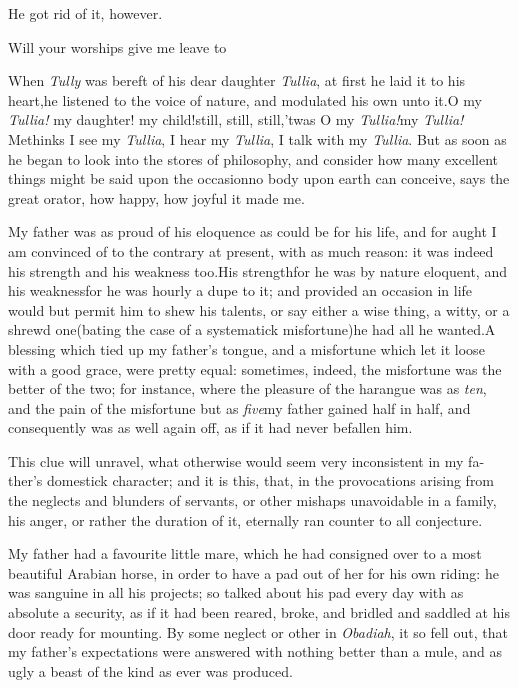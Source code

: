 \documentclass{article}
\begin{document}
\tsh  He got rid of it, however.

Will your worships give me leave to

When \textit{Tully} was bereft of his dear\break
daughter \textit{Tullia}, at first he laid it to his\break
heart,\tsk he listened to the voice of nature,\break
and modulated his own unto it.\tsk O my\break
\textit{Tullia!} my daughter!  my child!\tsk still, still, still,\tsk ’twas O my
\textit{Tullia!}\tsh my \textit{Tullia!} Methinks I see my
\textit{Tullia}, I hear my \textit{Tullia}, I talk with my
\textit{Tullia}.\tsk\break
But as soon as he began to look into the stores of
philosophy, and consider how many excellent things might
be said upon the occasion\tsk no body upon earth can
conceive, says the great orator, how happy, how joyful it
made me.


My father was as proud of his eloquence as
 could be for his
life, and for aught I am convinced of to the contrary at
present, with as much reason: it was indeed his strength\tsk
and his weakness too.\tsk His strength\tsk for he was by
nature eloquent,\break
\tsk and his weakness\tsk for he was hourly a
dupe to it; and provided an occasion in life would but
permit him to shew his talents, or say either a wise thing,
a witty, or a shrewd one\tsk (bating the case of a
systematick misfortune)\tsk he had all he wanted.\tsk A
blessing which tied up my father’s tongue, and a misfortune
which let it loose with a good grace, were pretty equal:
sometimes, indeed, the misfortune was the better of the two;
for instance, where the pleasure of the harangue was as
\textit{ten}, and the pain of the misfortune but as
\textit{five}\tsk my father gained half in half, and
consequently was as well again off, as if it had never
befallen him.  

This clue will unravel, what otherwise would seem very
inconsistent in my fa- ther’s domestick character; and it is
this, that, in the provocations arising from the neglects and
blunders of servants, or o\-ther mishaps unavoidable in a family, his
anger, or rather the duration of it, eternally ran counter to all
conjecture.

My father had a favourite little mare, which he had
consigned over to a most beautiful Arabian horse, in order
to have a pad out of her for his own riding: he was sanguine
in all his projects; so talked about his pad every day with
as absolute a security, as if it had been reared, broke,\tsk
and bridled and saddled at his door ready for mounting. By
some neglect or other in \textit{Obadiah}, it so fell out,
that my father’s expectations were answered with nothing
better than a mule, and as ugly a beast of the kind as ever
was produced.
\end{document}

